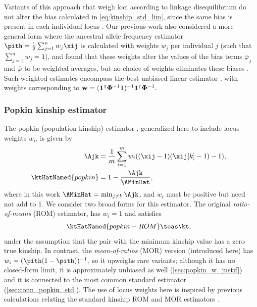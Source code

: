 \documentclass[11pt]{article}
\newcommand{\kinMat}{%
  \ensuremath{%
    \mathbf{\Phi}
  }%
  \xspace%
}%
\begin{document}
Variants of this approach that weigh loci according to linkage disequilibrium \citep{speed_reevaluation_2017, wang_efficient_2017} do not alter the bias calculated in \cref{eq:kinship_std_lim}, since the same bias is present in each individual locus \citep{ochoa_estimating_2021}.
Our previous work also considered a more general form where the ancestral allele frequency estimator $\pith = \frac{1}{2} \sum_{j=1}^n w_j \xij$ is calculated with weights $w_j$ per individual $j$ (such that $\sum_{j=1}^n w_j = 1$), and found that these weights alter the values of the bias terms $\bar{\varphi}_j$ and $\bar{\varphi}$ to be weighted averages, but no choice of weights eliminates these biases \citep{ochoa_estimating_2021}.
Such weighted \pith estimates encompass the best unbiased linear estimator \citep{astle_population_2009, thornton_roadtrips:_2010}, with weights corresponding to
$
\mathbf{w} = ( \mathbf{1}^\intercal \kinMat^{-1} \mathbf{1} )^{-1} \mathbf{1}^\intercal \kinMat^{-1}.
$

\subsubsection{Popkin kinship estimator}

The popkin (population kinship) estimator \citep{ochoa_estimating_2021}, generalized here to include locus weights $w_i$, is given by
\begin{equation}
  \label{eq:popkin}
  \begin{split}
    \Ajk
    &=
      \frac{1}{m} \sum_{i=1}^m w_i ( (\xij-1)(\xij[k]-1) - 1 )
      , \\
    \ktHatNamed{popkin}
    &=
      1 - \frac{\Ajk}{\AMinHat}
      ,
  \end{split}
\end{equation}
where in this work $\AMinHat = \min_{j \ne k} \Ajk$, and $w_i$ must be positive but need not add to 1.
We consider two broad forms for this estimator.
The original \textit{ratio-of-means} (ROM) estimator, has $w_i = 1$ and satisfies
$$
\ktHatNamed{popkin-ROM} \toas \kt,
$$
under the assumption that the pair with the minimum kinship value has a zero true kinship.
In contrast, the \textit{mean-of-ratios} (MOR) version (introduced here) has $w_i = (\pith (1-\pith))^{-1}$, so it upweighs rare variants; although it has no closed-form limit, it is approximately unbiased as well (\cref{sec:popkin_w_justif}) and it is connected to the most common standard estimator (\cref{sec:conn_popkin_std}). 
The use of locus weights here is inspired by previous calculations relating the standard kinship ROM and MOR estimators \citep{wang_efficient_2017}.
\end{document}
